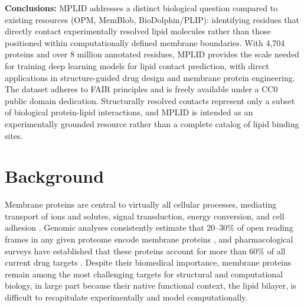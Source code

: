 \documentclass[unnumsec,webpdf,contemporary,large]{oup-authoring-template}
\begin{document}
{\textbf{Conclusions:} MPLID addresses a distinct biological question compared to existing resources (OPM, MemBlob, BioDolphin/PLIP): identifying residues that directly contact experimentally resolved lipid molecules rather than those positioned within computationally defined membrane boundaries. With 4,704 proteins and over 8 million annotated residues, MPLID provides the scale needed for training deep learning models for lipid contact prediction, with direct applications in structure-guided drug design and membrane protein engineering. The dataset adheres to FAIR principles and is freely available under a CC0 public domain dedication. Structurally resolved contacts represent only a subset of biological protein-lipid interactions, and MPLID is intended as an experimentally grounded resource rather than a complete catalog of lipid binding sites.}


\maketitle


\section{Background}

Membrane proteins are central to virtually all cellular processes, mediating transport of ions and solutes, signal transduction, energy conversion, and cell adhesion \cite{wallin1998}. Genomic analyses consistently estimate that 20--30\% of open reading frames in any given proteome encode membrane proteins \cite{wallin1998}, and pharmacological surveys have established that these proteins account for more than 60\% of all current drug targets \cite{overington2006, santos2017}. Despite their biomedical importance, membrane proteins remain among the most challenging targets for structural and computational biology, in large part because their native functional context, the lipid bilayer, is difficult to recapitulate experimentally and model computationally.
\end{document}
